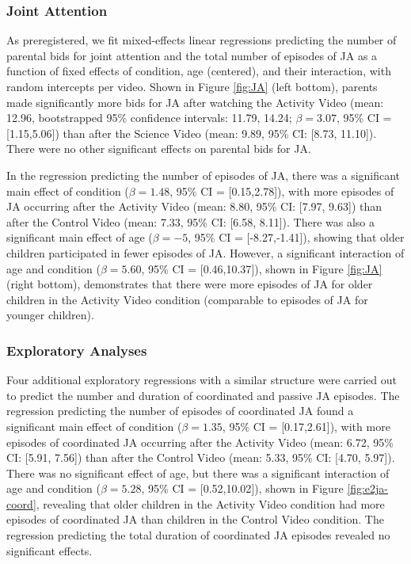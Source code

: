 \documentclass[man,floatsintext]{apa6}
\begin{document}
\hypertarget{joint-attention-1}{%
\subsubsection{Joint Attention}\label{joint-attention-1}}

As preregistered, we fit mixed-effects linear regressions predicting the number of parental bids for joint attention and the total number of episodes of JA as a function of fixed effects of condition, age (centered), and their interaction, with random intercepts per video.
Shown in Figure \ref{fig:JA} (left bottom), parents made significantly more bids for JA after watching the Activity Video (mean: 12.96, bootstrapped 95\% confidence intervals: 11.79, 14.24; \(\beta=3.07\), 95\% CI = {[}1.15,5.06{]}) than after the Science Video (mean: 9.89, 95\% CI: {[}8.73, 11.10{]}).
There were no other significant effects on parental bids for JA.

In the regression predicting the number of episodes of JA, there was a significant main effect of condition (\(\beta=1.48\), 95\% CI = {[}0.15,2.78{]}), with more episodes of JA occurring after the Activity Video (mean: 8.80, 95\% CI: {[}7.97, 9.63{]}) than after the Control Video (mean: 7.33, 95\% CI: {[}6.58, 8.11{]}).
There was also a significant main effect of age (\(\beta=-5\), 95\% CI = {[}-8.27,-1.41{]}), showing that older children participated in fewer episodes of JA.
However, a significant interaction of age and condition (\(\beta=5.60\), 95\% CI = {[}0.46,10.37{]}), shown in Figure \ref{fig:JA} (right bottom), demonstrates that there were more episodes of JA for older children in the Activity Video condition (comparable to episodes of JA for younger children).

\hypertarget{exploratory-analyses-1}{%
\subsubsection{Exploratory Analyses}\label{exploratory-analyses-1}}

Four additional exploratory regressions with a similar structure were carried out to predict the number and duration of coordinated and passive JA episodes.
The regression predicting the number of episodes of coordinated JA found a significant main effect of condition (\(\beta=1.35\), 95\% CI = {[}0.17,2.61{]}), with more episodes of coordinated JA occurring after the Activity Video (mean: 6.72, 95\% CI: {[}5.91, 7.56{]}) than after the Control Video (mean: 5.33, 95\% CI: {[}4.70, 5.97{]}).
There was no significant effect of age, but there was a significant interaction of age and condition (\(\beta=5.28\), 95\% CI = {[}0.52,10.02{]}), shown in Figure \ref{fig:e2ja-coord}, revealing that older children in the Activity Video condition had more episodes of coordinated JA than children in the Control Video condition.
The regression predicting the total duration of coordinated JA episodes revealed no significant effects.
\end{document}
